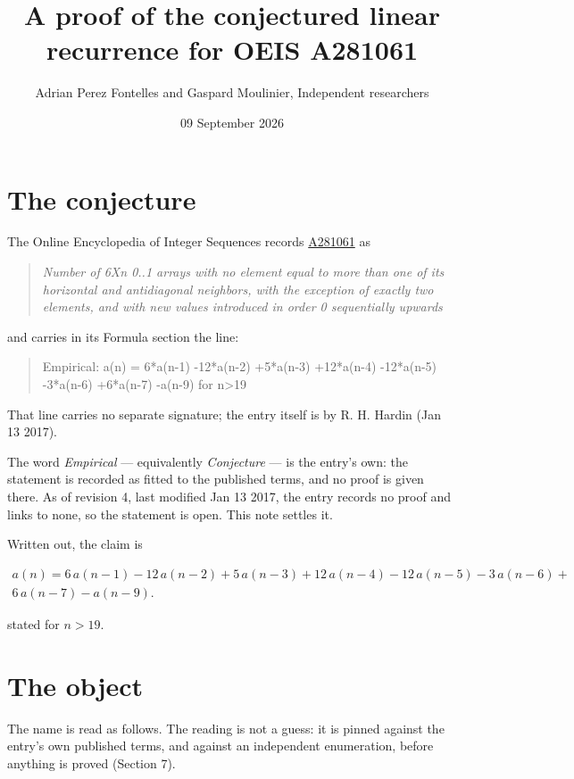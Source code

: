 \documentclass[11pt]{article}
\title{A proof of the conjectured linear recurrence for OEIS A281061}
\author{Adrian Perez Fontelles and Gaspard Moulinier, Independent researchers}
\date{09 September 2026}
\theoremstyle{definition}
\begin{document}
\maketitle
\section{The conjecture}

The Online Encyclopedia of Integer Sequences records \href{https://oeis.org/A281061}{A281061} as

\begin{quote}\itshape Number of 6Xn 0..1 arrays with no element equal to more than one of its horizontal and antidiagonal neighbors, with the exception of exactly two elements, and with new values introduced in order 0 sequentially upwards\end{quote}

and carries in its Formula section the line:

\begin{quote}\ttfamily Empirical: a(n) = 6*a(n-1) -12*a(n-2) +5*a(n-3) +12*a(n-4) -12*a(n-5) -3*a(n-6) +6*a(n-7) -a(n-9) for n>19\end{quote}

That line carries no separate signature; the entry itself is by R. H. Hardin (Jan 13 2017).

The word {\itshape Empirical} --- equivalently {\itshape Conjecture} --- is the entry's own: the statement is recorded as fitted to the published terms, and no proof is given there. As of revision 4, last modified Jan 13 2017, the entry records no proof and links to none, so the statement is open. This note settles it.

Written out, the claim is

\begin{multline*} a(n) = 6\,a(n-1) - 12\,a(n-2) + 5\,a(n-3) + 12\,a(n-4) - 12\,a(n-5) - 3\,a(n-6) + \\ 6\,a(n-7) - a(n-9). \end{multline*}

stated for $n > 19$.

\section{The object}

The name is read as follows. The reading is not a guess: it is pinned against the entry's own published terms, and against an independent enumeration, before anything is proved (Section 7).
\end{document}
